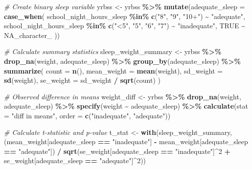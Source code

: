 \documentclass[
]{article}
\newenvironment{Shaded}{\begin{snugshade}}{\end{snugshade}}
\newcommand{\AttributeTok}[1]{\textcolor[rgb]{0.13,0.29,0.53}{#1}}
\newcommand{\CommentTok}[1]{\textcolor[rgb]{0.56,0.35,0.01}{\textit{#1}}}
\newcommand{\ConstantTok}[1]{\textcolor[rgb]{0.56,0.35,0.01}{#1}}
\newcommand{\DecValTok}[1]{\textcolor[rgb]{0.00,0.00,0.81}{#1}}
\newcommand{\FunctionTok}[1]{\textcolor[rgb]{0.13,0.29,0.53}{\textbf{#1}}}
\newcommand{\NormalTok}[1]{#1}
\newcommand{\OtherTok}[1]{\textcolor[rgb]{0.56,0.35,0.01}{#1}}
\newcommand{\SpecialCharTok}[1]{\textcolor[rgb]{0.81,0.36,0.00}{\textbf{#1}}}
\newcommand{\StringTok}[1]{\textcolor[rgb]{0.31,0.60,0.02}{#1}}
\begin{document}
\begin{Shaded}
\begin{Highlighting}[]
\CommentTok{\# Create binary sleep variable}
\NormalTok{yrbss }\OtherTok{\textless{}{-}}\NormalTok{ yrbss }\SpecialCharTok{\%\textgreater{}\%}
  \FunctionTok{mutate}\NormalTok{(}\AttributeTok{adequate\_sleep =} \FunctionTok{case\_when}\NormalTok{(}
\NormalTok{    school\_night\_hours\_sleep }\SpecialCharTok{\%in\%} \FunctionTok{c}\NormalTok{(}\StringTok{"8"}\NormalTok{, }\StringTok{"9"}\NormalTok{, }\StringTok{"10+"}\NormalTok{) }\SpecialCharTok{\textasciitilde{}} \StringTok{"adequate"}\NormalTok{,}
\NormalTok{    school\_night\_hours\_sleep }\SpecialCharTok{\%in\%} \FunctionTok{c}\NormalTok{(}\StringTok{"\textless{}5"}\NormalTok{, }\StringTok{"5"}\NormalTok{, }\StringTok{"6"}\NormalTok{, }\StringTok{"7"}\NormalTok{) }\SpecialCharTok{\textasciitilde{}} \StringTok{"inadequate"}\NormalTok{,}
    \ConstantTok{TRUE} \SpecialCharTok{\textasciitilde{}} \ConstantTok{NA\_character\_}
\NormalTok{  ))}

\CommentTok{\# Calculate summary statistics}
\NormalTok{sleep\_weight\_summary }\OtherTok{\textless{}{-}}\NormalTok{ yrbss }\SpecialCharTok{\%\textgreater{}\%}
  \FunctionTok{drop\_na}\NormalTok{(weight, adequate\_sleep) }\SpecialCharTok{\%\textgreater{}\%}
  \FunctionTok{group\_by}\NormalTok{(adequate\_sleep) }\SpecialCharTok{\%\textgreater{}\%}
  \FunctionTok{summarize}\NormalTok{(}
    \AttributeTok{count =} \FunctionTok{n}\NormalTok{(),}
    \AttributeTok{mean\_weight =} \FunctionTok{mean}\NormalTok{(weight),}
    \AttributeTok{sd\_weight =} \FunctionTok{sd}\NormalTok{(weight),}
    \AttributeTok{se\_weight =}\NormalTok{ sd\_weight }\SpecialCharTok{/} \FunctionTok{sqrt}\NormalTok{(count)}
\NormalTok{  )}

\CommentTok{\# Observed difference in means}
\NormalTok{weight\_diff }\OtherTok{\textless{}{-}}\NormalTok{ yrbss }\SpecialCharTok{\%\textgreater{}\%}
  \FunctionTok{drop\_na}\NormalTok{(weight, adequate\_sleep) }\SpecialCharTok{\%\textgreater{}\%}
  \FunctionTok{specify}\NormalTok{(weight }\SpecialCharTok{\textasciitilde{}}\NormalTok{ adequate\_sleep) }\SpecialCharTok{\%\textgreater{}\%}
  \FunctionTok{calculate}\NormalTok{(}\AttributeTok{stat =} \StringTok{"diff in means"}\NormalTok{, }\AttributeTok{order =} \FunctionTok{c}\NormalTok{(}\StringTok{"inadequate"}\NormalTok{, }\StringTok{"adequate"}\NormalTok{))}

\CommentTok{\# Calculate t{-}statistic and p{-}value}
\NormalTok{t\_stat }\OtherTok{\textless{}{-}} \FunctionTok{with}\NormalTok{(sleep\_weight\_summary, }
\NormalTok{               (mean\_weight[adequate\_sleep }\SpecialCharTok{==} \StringTok{"inadequate"}\NormalTok{] }\SpecialCharTok{{-}}\NormalTok{ mean\_weight[adequate\_sleep }\SpecialCharTok{==} \StringTok{"adequate"}\NormalTok{]) }\SpecialCharTok{/} 
               \FunctionTok{sqrt}\NormalTok{(se\_weight[adequate\_sleep }\SpecialCharTok{==} \StringTok{"inadequate"}\NormalTok{]}\SpecialCharTok{\^{}}\DecValTok{2} \SpecialCharTok{+}\NormalTok{ se\_weight[adequate\_sleep }\SpecialCharTok{==} \StringTok{"adequate"}\NormalTok{]}\SpecialCharTok{\^{}}\DecValTok{2}\NormalTok{))}


\end{Highlighting}
\end{Shaded}
\end{document}
